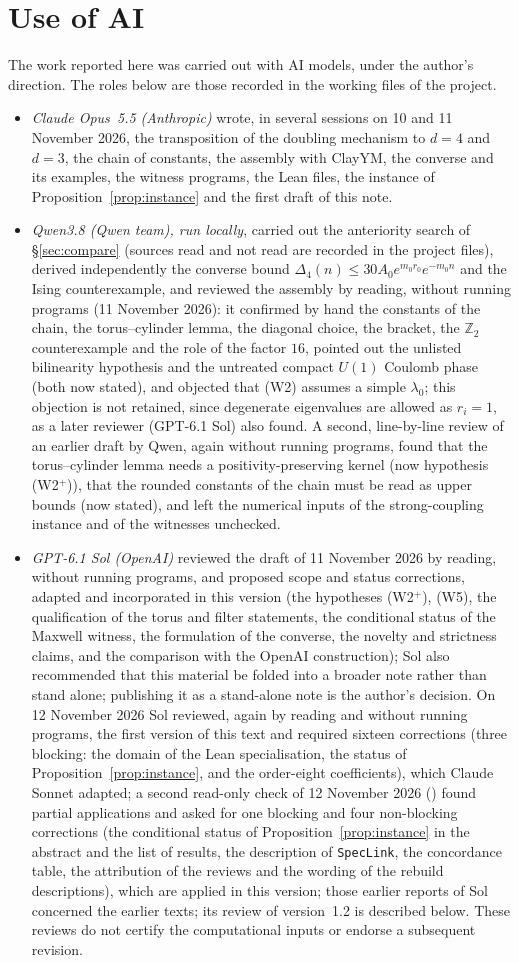 \documentclass[11pt,a4paper]{article}
\theoremstyle{plain}
\theoremstyle{definition}
\theoremstyle{remark}
\numberwithin{equation}{section}
\newcommand{\Z}{\mathbb{Z}}
\newcommand{\REVIEWSTATUS}{reviewed the assembly by reading, without running programs (11 November 2026): it confirmed by hand the constants of the chain, the torus--cylinder lemma, the diagonal choice, the bracket, the $\Z_2$ counterexample and the role of the factor $16$, pointed out the unlisted bilinearity hypothesis and the untreated compact $U(1)$ Coulomb phase (both now stated), and objected that (W2) assumes a simple $\lambda_0$; this objection is not retained, since degenerate eigenvalues are allowed as $r_i=1$, as a later reviewer (GPT-6.1 Sol) also found. A second, line-by-line review of an earlier draft by Qwen, again without running programs, found that the torus--cylinder lemma needs a positivity-preserving kernel (now hypothesis (W2$^+$)), that the rounded constants of the chain must be read as upper bounds (now stated), and left the numerical inputs of the strong-coupling instance and of the witnesses unchecked.}
\begin{document}
\section*{Use of AI}\label{sec:ai}
The work reported here was carried out with AI models, under the author's direction. The roles below are those recorded in the working
files of the project.
\begin{itemize}
\item \emph{Claude Opus~5.5 (Anthropic)} wrote, in several sessions on 10 and 11 November 2026, the transposition of the doubling mechanism to
$d=4$ and $d=3$, the chain of constants, the assembly with ClayYM, the converse and its examples, the witness programs, the Lean files, the
instance of Proposition~\ref{prop:instance} and the first draft of this note.
\item \emph{Qwen3.8 (Qwen team), run locally}, carried out the anteriority search of \S\ref{sec:compare} (sources read and not read are
recorded in the project files), derived independently the converse bound $\Delta_4(n)\le30A_0e^{m_0r_0}e^{-m_0n}$ and the Ising
counterexample, and \REVIEWSTATUS
\item \emph{GPT-6.1 Sol (OpenAI)} reviewed the draft of 11 November 2026 by reading, without running programs, and proposed scope and status
corrections, adapted and incorporated in this version (the hypotheses (W2$^+$), (W5), the qualification of the torus and filter statements, the
conditional status of the Maxwell witness, the formulation of the converse, the novelty and strictness claims, and the comparison with the OpenAI
construction); Sol also recommended that this material be folded into a broader note rather than stand alone; publishing it as a stand-alone note is the author's decision. On 12 November 2026 Sol reviewed, again by reading and without running programs, the first version of this text and required sixteen corrections (three blocking: the domain of the Lean specialisation, the status of Proposition~\ref{prop:instance}, and the order-eight coefficients), which Claude Sonnet adapted; a second read-only check of 12 November 2026 () found partial applications and asked for one blocking and four non-blocking corrections (the conditional status of Proposition~\ref{prop:instance} in the abstract and the list of results, the description of \texttt{SpecLink}, the concordance table, the attribution of the reviews and the wording of the rebuild descriptions), which are applied in this version; those earlier reports of Sol concerned the earlier texts; its review of version~1.2 is described below. These reviews do not certify the computational inputs or endorse a subsequent revision.

\end{itemize}
\end{document}
